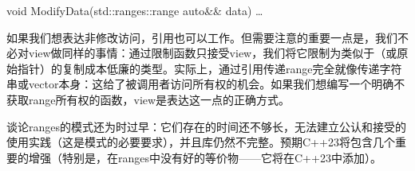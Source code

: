 \begin{code}
void ModifyData(std::ranges::range auto&& data) { … }
\end{code}

如果我们想表达非修改访问，引用也可以工作。但需要注意的重要一点是，我们不必对view做同样的事情：通过限制函数只接受view，我们将它限制为类似于（或原始指针）的复制成本低廉的类型。实际上，通过引用传递range完全就像传递字符串或vector本身：这给了被调用者访问所有权的机会。如果我们想编写一个明确不获取range所有权的函数，view是表达这一点的正确方式。

谈论\cpp[20]  ranges的模式还为时过早：它们存在的时间还不够长，无法建立公认和接受的使用实践（这是模式的必要要求），并且库仍然不完整。预期C++23将包含几个重要的增强（特别是，在\cpp[20]  ranges中没有好的等价物——它将在C++23中添加）。

